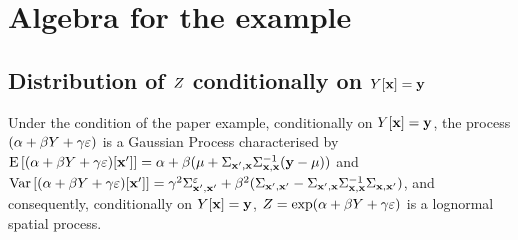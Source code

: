 

\newpage
\section{Algebra for the example}
\subsection{Distribution of  $Z$ conditionally on  $Y[\mathbf{x}]=\mathbf{y}$}\label{sec:A.owifjoeij}
Under the condition of the paper example, conditionally on $Y[\mathbf{x}]=\mathbf{y}$, the process $(\alpha+\beta Y+\gamma\varepsilon)$ is a Gaussian Process characterised by
$\mathrm{E}\left[(\alpha+\beta Y+\gamma\varepsilon)[\mathbf{x}']\right]=\alpha+\beta(\mu+\Sigma_{\mathbf{x}',\mathbf{x}}\Sigma_{\mathbf{x},\mathbf{x}}^{-1} (\mathbf{y}-\mu))$ and  $\mathrm{Var}\left[(\alpha+\beta Y+\gamma\varepsilon)[\mathbf{x}']\right]=\gamma^2\Sigma^\varepsilon_{\mathbf{x}',\mathbf{x}'}+\beta^2(\Sigma_{\mathbf{x}',\mathbf{x}'}-\Sigma_{\mathbf{x}',\mathbf{x}}\Sigma_{\mathbf{x},\mathbf{x}}^{-1}\Sigma_{\mathbf{x},\mathbf{x}'})$, and consequently, conditionally on $Y[\mathbf{x}]=\mathbf{y}$, $Z=\exp(\alpha+\beta Y+\gamma\varepsilon)$ is a lognormal spatial process.

%
%

